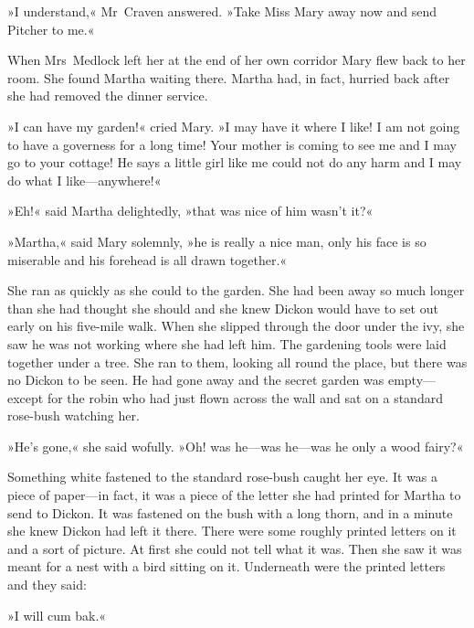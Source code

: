 »I understand,« Mr~Craven answered. »Take Miss Mary away now and send Pitcher to me.«

When Mrs~Medlock left her at the end of her own corridor Mary flew back to her room. She found Martha waiting there. Martha had, in fact, hurried back after she had removed the dinner service.

»I can have my garden!« cried Mary. »I may have it where I like! I am not going to have a governess for a long time! Your mother is coming to see me and I may go to your cottage! He says a little girl like me could not do any harm and I may do what I like—anywhere!«

»Eh!« said Martha delightedly, »that was nice of him wasn't it?«

»Martha,« said Mary solemnly, »he is really a nice man, only his face is so miserable and his forehead is all drawn together.«

She ran as quickly as she could to the garden. She had been away so much longer than she had thought she should and she knew Dickon would have to set out early on his five-mile walk. When she slipped through the door under the ivy, she saw he was not working where she had left him. The gardening tools were laid together under a tree. She ran to them, looking all round the place, but there was no Dickon to be seen. He had gone away and the secret garden was empty—except for the robin who had just flown across the wall and sat on a standard rose-bush watching her.

»He's gone,« she said wofully. »Oh! was he—was he—was he only a wood fairy?«

Something white fastened to the standard rose-bush caught her eye. It was a piece of paper—in fact, it was a piece of the letter she had printed for Martha to send to Dickon. It was fastened on the bush with a long thorn, and in a minute she knew Dickon had left it there. There were some roughly printed letters on it and a sort of picture. At first she could not tell what it was. Then she saw it was meant for a nest with a bird sitting on it. Underneath were the printed letters and they said:

»I will cum bak.«
